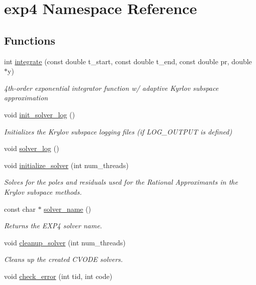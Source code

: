 \hypertarget{namespaceexp4}{}\section{exp4 Namespace Reference}
\label{namespaceexp4}
\subsection*{Functions}
\begin{DoxyCompactItemize}
\item 
int \hyperlink{namespaceexp4_a8d03ab917f8736a37474362beeff9391}{integrate} (const double t\+\_\+start, const double t\+\_\+end, const double pr, double $\ast$y)
\begin{DoxyCompactList}\small\item\em 4th-\/order exponential integrator function w/ adaptive Kyrlov subspace approximation \end{DoxyCompactList}\item 
void \hyperlink{namespaceexp4_a1ef7b39a9ac7da4247fd05807f000b07}{init\+\_\+solver\+\_\+log} ()
\begin{DoxyCompactList}\small\item\em Initializes the Krylov subspace logging files (if L\+O\+G\+\_\+\+O\+U\+T\+P\+UT is defined) \end{DoxyCompactList}\item 
void \hyperlink{namespaceexp4_adc563232bff1c62e2068039175a6f428}{solver\+\_\+log} ()
\item 
void \hyperlink{namespaceexp4_ab5d3c8262078fd94e511c54eb766f46c}{initialize\+\_\+solver} (int num\+\_\+threads)
\begin{DoxyCompactList}\small\item\em Solves for the poles and residuals used for the Rational Approximants in the Krylov subspace methods. \end{DoxyCompactList}\item 
const char $\ast$ \hyperlink{namespaceexp4_aecc47dad1f4379532ab54b896a5e3771}{solver\+\_\+name} ()
\begin{DoxyCompactList}\small\item\em Returns the E\+X\+P4 solver name. \end{DoxyCompactList}\item 
void \hyperlink{namespaceexp4_a0a595493de14a8f82826268b344339a8}{cleanup\+\_\+solver} (int num\+\_\+threads)
\begin{DoxyCompactList}\small\item\em Cleans up the created C\+V\+O\+DE solvers. \end{DoxyCompactList}\item 
void \hyperlink{namespaceexp4_a40f949e51fd1c796b23f6d81612720fb}{check\+\_\+error} (int tid, int code)
\end{DoxyCompactItemize}


